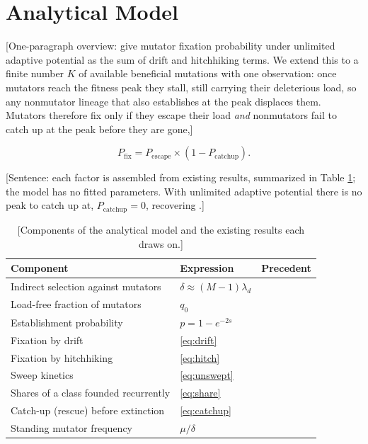 \section{Analytical Model} \label{sec:model}

[One-paragraph overview: \citet{raynes2018sign} give mutator fixation probability under unlimited adaptive potential as the sum of drift and hitchhiking terms.
We extend this to a finite number $K$ of available beneficial mutations with one observation: once mutators reach the fitness peak they stall, still carrying their deleterious load, so any nonmutator lineage that also establishes at the peak displaces them.
Mutators therefore fix only if they escape their load \textit{and} nonmutators fail to catch up at the peak before they are gone,]

\begin{equation}
  P_\mathrm{fix} = P_\mathrm{escape} \times \left(1 - P_\mathrm{catchup}\right). \label{eq:fix}
\end{equation}

[Sentence: each factor is assembled from existing results, summarized in Table \ref{tab:model}; the model has no fitted parameters.
With unlimited adaptive potential there is no peak to catch up at, $P_\mathrm{catchup} = 0$, recovering \citet{raynes2018sign}.]

\begin{table}[h]
  \centering
  \footnotesize
  \begin{tabular}{lll}
    \hline
    Component & Expression & Precedent \\
    \hline
    Indirect selection against mutators & $\delta \approx (M - 1) \lambda_d$ & \citet{johnson1999approach} \\
    Load-free fraction of mutators & $q_0$ & \citet{haigh1978accumulation} \\
    Establishment probability & $p = 1 - e^{-2s}$ & \citet{kimura1962probability,raynes2018sign} \\
    Fixation by drift & \cref{eq:drift} & \citet{kimura1962probability} \\
    Fixation by hitchhiking & \cref{eq:hitch} & \citet{raynes2018sign} \\
    Sweep kinetics & \cref{eq:unswept} & \citet{kolmogorov1937statistical,avrami1939kinetics,ralph2010parallel} \\
    Shares of a class founded recurrently & \cref{eq:share} & \citet{pennings2006soft} \\
    Catch-up (rescue) before extinction & \cref{eq:catchup} & \citet{orr2008population} \\
    Standing mutator frequency & $\mu / \delta$ & \citet{johnson1999approach} \\
    \hline
  \end{tabular}
  \caption{[Components of the analytical model and the existing results each draws on.]}
  \label{tab:model}
\end{table}

